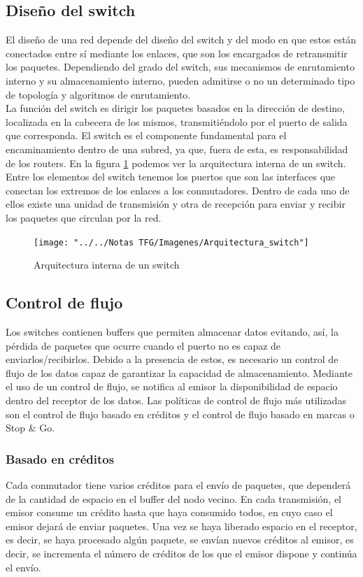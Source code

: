 \subsection{Diseño del switch}
El diseño de una red depende del diseño del switch y del modo en que estos están conectados entre sí mediante los enlaces, que son los encargados de retransmitir los paquetes. Dependiendo del grado del switch, sus mecanismos de enrutamiento interno y su almacenamiento interno, pueden admitirse o no un determinado tipo de topología y algoritmos de enrutamiento.\\

La función del switch es dirigir los paquetes basados en la dirección de destino, localizada en la cabecera de los mismos, transmitiéndolo por el puerto de salida que corresponda. El switch es el componente fundamental para el encaminamiento dentro de una subred, ya que, fuera de esta, es responsabilidad de los routers. En la figura \ref{fig:arquitecturaswitch} podemos ver la arquitectura interna de un switch.\\

Entre los elementos del switch tenemos los puertos que son las interfaces que conectan los extremos de los enlaces a los conmutadores. Dentro de cada uno de ellos existe una unidad de transmisión y otra de recepción para enviar y recibir los paquetes que circulan por la red.

\begin{figure}[H]
	\centering
	\texttt{[image: "../../Notas TFG/Imagenes/Arquitectura\_switch"]}
	\caption{Arquitectura interna de un switch}
	\label{fig:arquitecturaswitch}
\end{figure}

\subsection{Control de flujo}
Los switches contienen buffers que permiten almacenar datos evitando, así, la pérdida de paquetes que ocurre cuando el puerto no es capaz de enviarlos/recibirlos. Debido a la presencia de estos, es necesario un control de flujo de los datos capaz de garantizar la capacidad de almacenamiento. Mediante el uso de un control de flujo, se notifica al emisor la disponibilidad de espacio dentro del receptor de los datos. Las políticas de control de flujo más utilizadas son el control de flujo basado en créditos y el control de flujo basado en marcas o Stop \& Go.

\subsubsection{Basado en créditos}
Cada conmutador tiene varios créditos para el envío de paquetes, que dependerá de la cantidad de espacio en el buffer del nodo vecino. En cada transmisión, el emisor consume un crédito hasta que haya consumido todos, en cuyo caso el emisor dejará de enviar paquetes. Una vez se haya liberado  espacio en el receptor, es decir, se haya procesado algún paquete, se envían nuevos créditos al emisor, es decir, se incrementa el número de créditos de los que el emisor dispone y continúa el envío.

